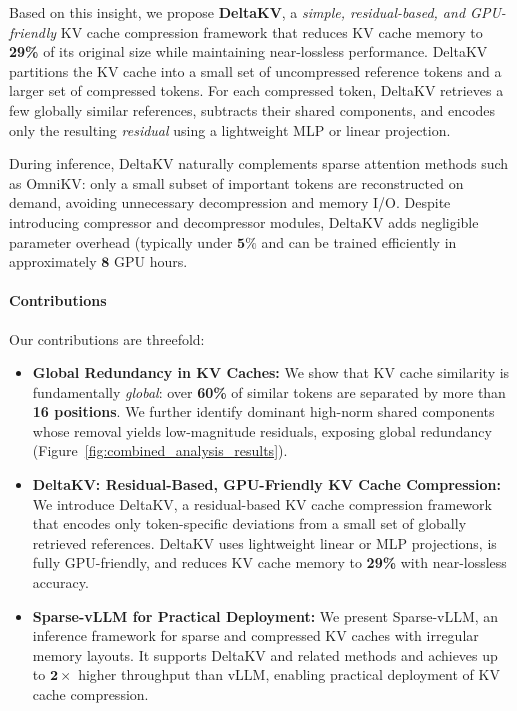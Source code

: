 Based on this insight, we propose \textbf{DeltaKV}, a \emph{simple, residual-based, and GPU-friendly} KV cache compression framework that reduces KV cache memory to \textbf{29\%} of its original size while maintaining near-lossless performance.
DeltaKV partitions the KV cache into a small set of uncompressed reference tokens and a larger set of compressed tokens. 
For each compressed token, DeltaKV retrieves a few globally similar references, subtracts their shared components, and encodes only the resulting \emph{residual} using a lightweight MLP or linear projection.

During inference, DeltaKV naturally complements sparse attention methods such as OmniKV: only a small subset of important tokens are reconstructed on demand, avoiding unnecessary decompression and memory I/O.
Despite introducing compressor and decompressor modules, DeltaKV adds negligible parameter overhead (typically under $\mathbf{5\%}$ and can be trained efficiently in approximately $\mathbf{8}$ GPU hours.

\paragraph{Contributions}
Our contributions are threefold:
\begin{itemize}[nolistsep, left=0pt]
  \vspace{-0.5em}
  \item \textbf{Global Redundancy in KV Caches:}
  We show that KV cache similarity is fundamentally \emph{global}: over \textbf{60\%} of similar tokens are separated by more than \textbf{16 positions}. 
  We further identify dominant high-norm shared components whose removal yields low-magnitude residuals, exposing global redundancy (Figure~\ref{fig:combined_analysis_results}).
  
  \item \textbf{DeltaKV: Residual-Based, GPU-Friendly KV Cache Compression:} 
  We introduce DeltaKV, a residual-based KV cache compression framework that encodes only token-specific deviations from a small set of globally retrieved references. 
  DeltaKV uses lightweight linear or MLP projections, is fully GPU-friendly, and reduces KV cache memory to \textbf{29\%} with near-lossless accuracy.

  \item \textbf{Sparse-vLLM for Practical Deployment:}
  We present Sparse-vLLM, an inference framework for sparse and compressed KV caches with irregular memory layouts. 
  It supports DeltaKV and related methods and achieves up to $\mathbf{2}\times$ higher throughput than vLLM, enabling practical deployment of KV cache compression.
\end{itemize}


